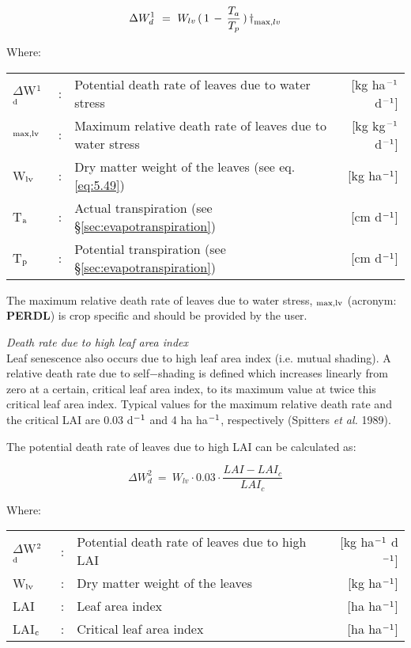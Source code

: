 \begin{equation}
\Delta W_{d}^{1} ~=~ W_{lv} \, (\, 1\, -\,{\frac{T _{a} }{T _{p} }} \, )\, {\rm \dag } _{\max ,lv} 
\end{equation}

Where:\\[5pt]
\begin{tabularx}{\textwidth}{llXr}
	$\Delta$W$^{{\rm 1}}$$_{{\rm d}}$ &:& Potential death rate of leaves due to water stress   &
	[kg  ha$^{{\rm -1}}$ d$^{{\rm -1}}$]\\
	\dag $_{{\rm max,lv}}$ &:& Maximum relative death rate of leaves due to
	water stress   &     [kg kg$^{{\rm -1}}$ d$^{{\rm -1}}$]\\
	W$_{{\rm lv}}$ &:& Dry matter weight of the leaves (see eq. \ref{eq:5.49})  &
	[kg ha$^{{\rm -1}}$]\\
	T$_{{\rm a}}$ &:& Actual transpiration (see \S \ref{sec:evapotranspiration})    &
	[cm d$^{{\rm -1}}$]\\
	T$_{{\rm p}}$ &:& Potential transpiration (see \S \ref{sec:evapotranspiration})   &
	[cm d$^{{\rm -1}}$]\\
\end{tabularx}

The maximum relative death rate of leaves due to water stress, {\bf \dag $_{{\rm max,lv}}$} 
(acronym: {\bf PERDL}) is crop specific and should be provided by the user.

{\it Death rate due to high leaf area index}\\
Leaf senescence also occurs due to high leaf area index (i.e. mutual shading). A relative
death rate due to self$-$shading is defined which increases linearly from zero at a certain,
critical leaf area index, to its maximum value at twice this critical leaf area index. Typical
values for the maximum relative death rate and the critical LAI are 0.03 d$^{{\rm -1}}$ and 4 
ha ha$^{{\rm -}{1}}$, respectively (Spitters {\it et al.} 1989).

The potential death rate of leaves due to high LAI can be calculated as:

\begin{equation}
\Delta W_{d}^{2} ~=~ W_{lv} \cdot 0.03 \cdot {\frac{LAI - LAI_c}{LAI_c}}
\end{equation}

Where:\\[5pt]
\begin{tabularx}{\textwidth}{llXr}
	$\Delta$W$^{{\rm 2}}$$_{{\rm d}}$ &:& Potential death rate of leaves due to 
	high LAI   &    [kg ha$^{{\rm -1}}$ d$^{{\rm -1}}$]\\
	W$_{{\rm lv}}$ &:& Dry matter weight of the leaves  &  [kg ha$^{{\rm -1}}$]\\
	LAI &:& Leaf area index   &    [ha ha$^{{\rm -1}}$]\\
	LAI$_{{\rm c}}$ &:& Critical leaf area index   &     [ha ha$^{{\rm -1}}$]\\
\end{tabularx}

